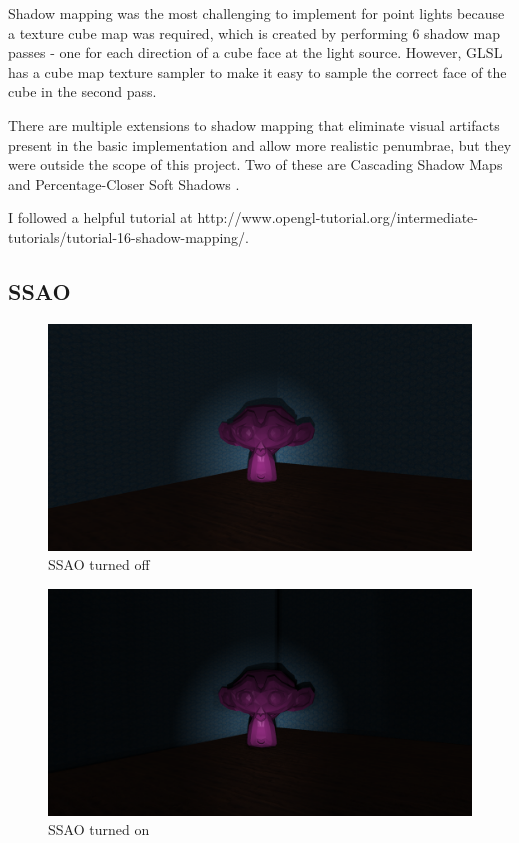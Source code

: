 \documentclass{book}
\begin{document}
      Shadow mapping was the most challenging to implement for point lights because a texture cube map was required, which is created by performing 6 shadow map passes - one for each direction of a cube face at the light source. However, GLSL has a cube map texture sampler to make it easy to sample the correct face of the cube in the second pass.

      There are multiple extensions to shadow mapping that eliminate visual artifacts present in the basic implementation and allow more realistic penumbrae, but they were outside the scope of this project. Two of these are Cascading Shadow Maps and Percentage-Closer Soft Shadows \cite{dimitrov2007cascaded} \cite{fernando2005percentage}.

      I followed a helpful tutorial at http://www.opengl-tutorial.org/intermediate-tutorials/tutorial-16-shadow-mapping/.

    \subsection{SSAO} \label{ssao}
      \begin{figure}[h!]
        \centering
        \includegraphics[width=1.0\textwidth]{nossao}
        \caption{SSAO turned off}
      \end{figure}

      \begin{figure}[h!]
        \centering
        \includegraphics[width=1.0\textwidth]{ssao}
        \caption{SSAO turned on}
      \end{figure}
\end{document}
